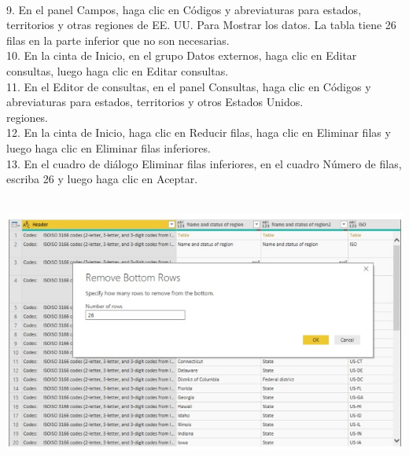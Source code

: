 \begin{flushleft}
\begin{itemize}
\textbf{ }\\
\textbf{ }\\
\textbf{ }\\
\textbf{ }\\
\textbf{ }\\
\textbf{ }\\
9. En el panel Campos, haga clic en Códigos y abreviaturas para estados, territorios y otras regiones de EE. UU. Para
Mostrar los datos. La tabla tiene 26 filas en la parte inferior que no son necesarias.\\
10. En la cinta de Inicio, en el grupo Datos externos, haga clic en Editar consultas, luego haga clic en Editar consultas.\\
11. En el Editor de consultas, en el panel Consultas, haga clic en Códigos y abreviaturas para estados, territorios y otros Estados Unidos.\\
regiones.\\
12. En la cinta de Inicio, haga clic en Reducir filas, haga clic en Eliminar filas y luego haga clic en Eliminar filas inferiores.\\
13. En el cuadro de diálogo Eliminar filas inferiores, en el cuadro Número de filas, escriba 26 y luego haga clic en Aceptar.\\
\textbf{ }\\
\begin{center}
	\includegraphics[width=15cm]{./Imagenes/image30} 
	\end{center}
\textbf{ }\\
\textbf{ }\\
\textbf{ }\\
\textbf{ }\\
\textbf{ }\\
\textbf{ }\\
\textbf{ }\\

\end{itemize}
\end{flushleft}
